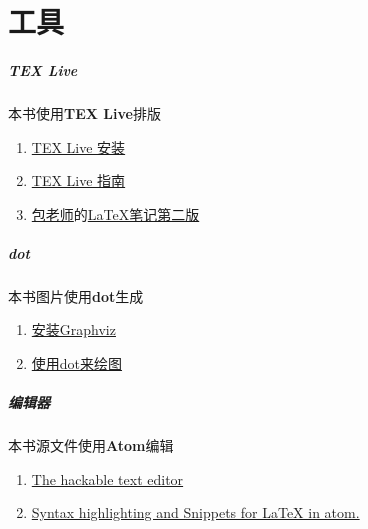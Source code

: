 \chapter{工具}

\paragraph{TEX Live}
本书使用\textbf{TEX Live}排版
\begin{enumerate}
  \item \href{https://wiki.archlinux.org/index.php/TeX_Live_(%E7%AE%80%E4%BD%93%E4%B8%AD%E6%96%87)}{TEX Live 安装}
  \item \href{https://www.tug.org/texlive/doc/texlive-zh-cn/texlive-zh-cn.pdf}{TEX Live 指南}
  \item \href{http://www.dralpha.com/zh/index.htm}{包老师}的\href{http://dralpha.altervista.org/zh/tech/lnotes2.pdf}{LaTeX笔记第二版}
\end{enumerate}

\paragraph{dot}
本书图片使用\textbf{dot}生成
\begin{enumerate}
  \item \href{https://wiki.archlinux.org/index.php/Graphviz}{安装Graphviz}
  \item \href{http://www.jianshu.com/p/5b02445eca1d}{使用dot来绘图}
\end{enumerate}

\paragraph{编辑器}
本书源文件使用\textbf{Atom}编辑
\begin{enumerate}
  \item \href{https://github.com/atom/atom}{The hackable text editor}
  \item \href{https://atom.io/packages/language-latex}{Syntax highlighting and Snippets for LaTeX in atom.}
\end{enumerate}
